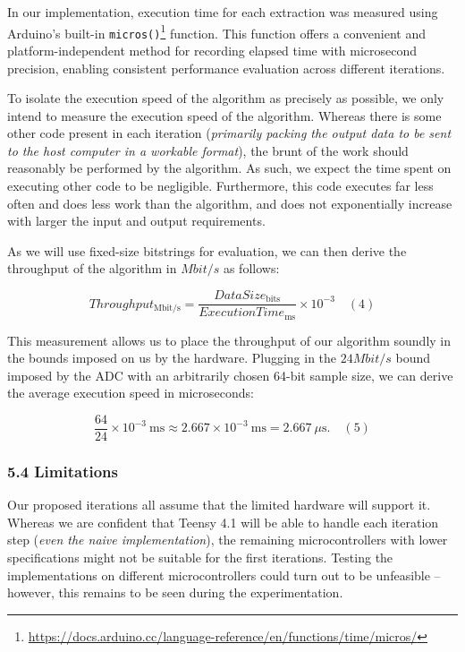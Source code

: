 In our implementation, execution time for each extraction was measured using Arduino's built-in \texttt{micros()}\footnote{\url{https://docs.arduino.cc/language-reference/en/functions/time/micros/}} function. This function offers a convenient and platform-independent method for recording elapsed time with microsecond precision, enabling consistent performance evaluation across different iterations.

To isolate the execution speed of the algorithm as precisely as possible, we only intend to measure the execution speed of the algorithm. Whereas there is some other code present in each iteration (\emph{primarily packing the output data to be sent to the host computer in a workable format}), the brunt of the work should reasonably be performed by the algorithm. As such, we expect the time spent on executing other code to be negligible. Furthermore, this code executes far less often and does less work than the algorithm, and does not exponentially increase with larger the input and output requirements.

As we will use fixed-size bitstrings for evaluation, we can then derive the throughput of the algorithm in \(Mbit/s\) as follows:

\[
Throughput_\mathrm{Mbit/s}
= \frac{DataSize_\mathrm{bits}}{ExecutionTime_\mathrm{ms}}
\times 10^{-3}
\phantom{12}(4)
\]

This measurement allows us to place the throughput of our algorithm soundly in the bounds imposed on us by the hardware. Plugging in the \(24 Mbit/s\) bound imposed by the ADC with an arbitrarily chosen 64-bit sample size, we can derive the average execution speed in microseconds:

\[
\frac{64}{24}\times10^{-3}\ \mathrm{ms}
\approx 2.667\times10^{-3}\ \mathrm{ms}
=2.667\ \mu\mathrm{s}.
\phantom{12}(5)
\]

\subsubsection{5.4 Limitations}\label{limitations}

Our proposed iterations all assume that the limited hardware will support it. Whereas we are confident that Teensy 4.1 will be able to handle each iteration step (\emph{even the naive implementation}), the remaining microcontrollers with lower specifications might not be suitable for the first iterations. Testing the implementations on different microcontrollers could turn out to be unfeasible -- however, this remains to be seen during the experimentation.

